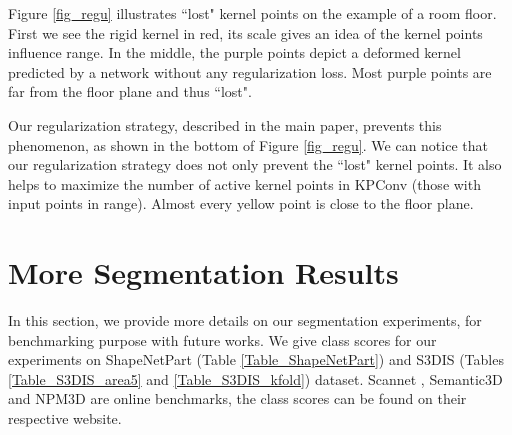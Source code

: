 \documentclass[10pt,twocolumn,letterpaper]{article}
\begin{document}
Figure \ref{fig_regu} illustrates ``lost" kernel points on the example of a room floor. First we see the rigid kernel in red, its scale gives an idea of the kernel points influence range. In the middle, the purple points depict a deformed kernel predicted by a network without any regularization loss. Most purple points are far from the floor plane and thus ``lost". 

Our regularization strategy, described in the main paper, prevents this phenomenon, as shown in the bottom of Figure \ref{fig_regu}. We can notice that our regularization strategy does not only prevent the ``lost" kernel points. It also helps to maximize the number of active kernel points in KPConv (those with input points in range). Almost every yellow point is close to the floor plane. 


\section{More Segmentation Results}
\label{sec:D}

In this section, we provide more details on our segmentation experiments, for benchmarking purpose with future works. We give class scores for our experiments on ShapeNetPart (Table \ref{Table_ShapeNetPart}) and S3DIS (Tables \ref{Table_S3DIS_area5} and \ref{Table_S3DIS_kfold}) dataset. Scannet \cite{dai2017scannet}, Semantic3D \cite{hackel2017semantic3d} and NPM3D \cite{roynard2018paris} are online benchmarks, the class scores can be found on their respective website.
\end{document}
